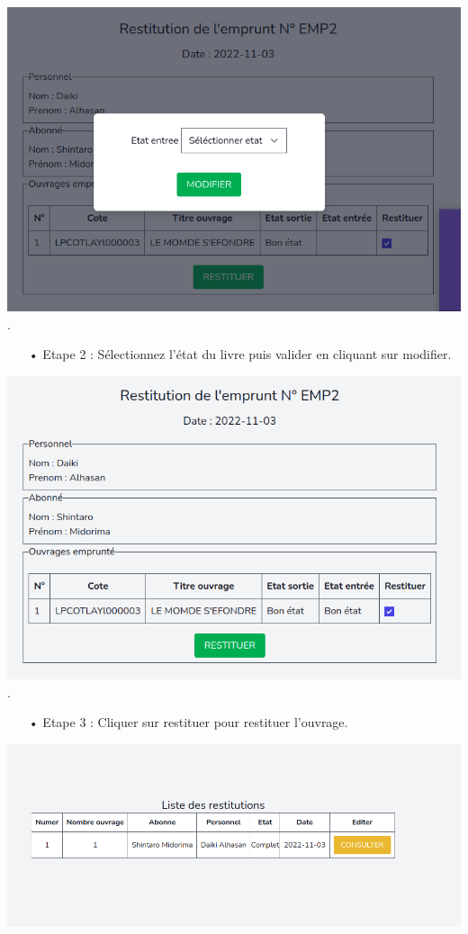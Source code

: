 \documentclass[12pt,a4paper]{article}
\begin{document}
\includegraphics[scale=0.5]{images/SelectEtat.png}.\\


\begin{itemize}
\item[•] Etape 2 : Sélectionnez l'état du livre puis valider en cliquant sur modifier.
\end{itemize}

\includegraphics[scale=0.5]{images/Restitutionbouton.png}.\\

\newpage
\begin{itemize}
\item[•] Etape 3 : Cliquer sur restituer pour restituer l'ouvrage.\\
\end{itemize}

\includegraphics[scale=0.5]{images/ListeDesRestitutions.png}
\end{document}

